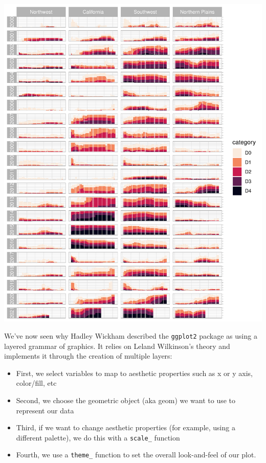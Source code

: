 \documentclass[
]{book}
\providecommand{\tightlist}{%
  \setlength{\itemsep}{0pt}\setlength{\parskip}{0pt}}
\begin{document}
\includegraphics[width=1\linewidth]{data-viz_files/figure-latex/unnamed-chunk-24-1}

We've now seen why Hadley Wickham described the \texttt{ggplot2} package as using a layered grammar of graphics. It relies on Leland Wilkinson's theory and implements it through the creation of multiple layers:

\begin{itemize}
\tightlist
\item
  First, we select variables to map to aesthetic properties such as x or y axis, color/fill, etc
\item
  Second, we choose the geometric object (aka geom) we want to use to represent our data
\item
  Third, if we want to change aesthetic properties (for example, using a different palette), we do this with a \texttt{scale\_} function
\item
  Fourth, we use a \texttt{theme\_} function to set the overall look-and-feel of our plot.
\end{itemize}
\end{document}
